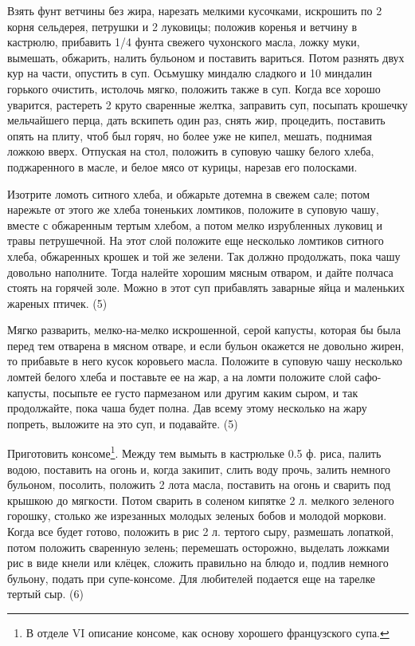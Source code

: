 
Взять фунт ветчины без жира, нарезать мелкими кусочками, искрошить по 2 корня сельдерея, петрушки и 2 луковицы; положив коренья и ветчину в кастрюлю, прибавить 1/4 фунта свежего чухонского масла, ложку муки, вымешать, обжарить, налить бульоном и поставить вариться. Потом разнять двух кур на части, опустить в суп. Осьмушку миндалю сладкого и 10 миндалин горького очистить, истолочь мягко, положить также в суп. Когда все хорошо уварится, растереть 2 круто сваренные желтка, заправить суп, посыпать крошечку мельчайшего перца, дать вскипеть один раз, снять жир, процедить, поставить опять на плиту, чтоб был горяч, но более уже не кипел, мешать, поднимая ложкою вверх. Отпуская на стол, положить в суповую чашку белого хлеба, поджаренного в масле, и белое мясо от курицы, нарезав его полосками.


Изотрите ломоть ситного хлеба, и обжарьте дотемна в свежем сале; потом нарежьте от этого же хлеба тоненьких ломтиков, положите в суповую чашу, вместе с обжаренным тертым хлебом, а потом мелко изрубленных луковиц и травы петрушечной. На этот слой положите еще несколько ломтиков ситного хлеба, обжаренных крошек и той же зелени. Так должно продолжать, пока чашу довольно наполните. Тогда налейте хорошим мясным отваром, и дайте полчаса стоять на горячей золе. Можно в этот суп прибавлять заварные яйца и маленьких жареных птичек. (5)


Мягко разварить, мелко-на-мелко искрошенной, серой капусты, которая бы была перед тем отварена в мясном отваре, и если бульон окажется не довольно жирен, то прибавьте в него кусок коровьего масла. Положите в суповую чашу несколько ломтей белого хлеба и поставьте ее на жар, а на ломти положите слой сафо-капусты, посыпьте ее густо пармезаном или другим каким сыром, и так продолжайте, пока чаша будет полна. Дав всему этому несколько на жару попреть, выложите на это суп, и подавайте. (5)


Приготовить консоме\footnote{В отделе VI описание консоме, как основу хорошего французского супа.}. Между тем вымыть в кастрюльке 0.5 ф. риса, палить водою, поставить на огонь и, когда закипит, слить воду прочь, залить немного бульоном, посолить, положить 2 лота масла, поставить на огонь и сварить под крышкою до мягкости. Потом сварить в соленом кипятке 2 л. мелкого зеленого горошку, столько же изрезанных молодых зеленых бобов и молодой моркови. Когда все будет готово, положить в рис 2 л. тертого сыру, размешать лопаткой, потом положить сваренную зелень; перемешать осторожно, выделать ложками рис в виде кнели или клёцек, сложить правильно на блюдо и, подлив немного бульону, подать при супе-консоме. Для любителей подается еще на тарелке тертый сыр. (6)

